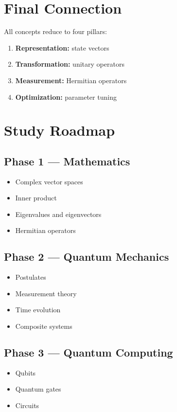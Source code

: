 \vspace{0.5cm}

\section*{Final Connection}

All concepts reduce to four pillars:

\begin{enumerate}
\item \textbf{Representation:} state vectors
\item \textbf{Transformation:} unitary operators
\item \textbf{Measurement:} Hermitian operators
\item \textbf{Optimization:} parameter tuning
\end{enumerate}

\vspace{0.5cm}

\section*{Study Roadmap}

\subsection*{Phase 1 --- Mathematics}
\begin{itemize}
\item Complex vector spaces
\item Inner product
\item Eigenvalues and eigenvectors
\item Hermitian operators
\end{itemize}

\subsection*{Phase 2 --- Quantum Mechanics}
\begin{itemize}
\item Postulates
\item Measurement theory
\item Time evolution
\item Composite systems
\end{itemize}

\subsection*{Phase 3 --- Quantum Computing}
\begin{itemize}
\item Qubits
\item Quantum gates
\item Circuits
\end{itemize}

